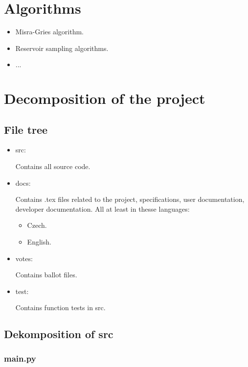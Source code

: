 \documentclass[a4paper,12pt]{report}
\begin{document}
	\section{Algorithms}
	
	\begin{itemize}
		\item Misra-Gries algorithm.
		\item Reservoir sampling algorithms.
		\item ...
	\end{itemize}
	
	\section{Decomposition of the project}
	
	\subsection{File tree}
	
	\begin{itemize}
		\item src:
		
		Contains all source code.
		
		\item docs:
		
		Contains .tex files related to the project, specifications, user documentation, developer documentation. All at least in thesse languages:
		
		\begin{itemize}
			\item Czech.
			\item English.
		\end{itemize}
		
		\item votes:
		
		Contains ballot files.
		
		\item test:
		
		Contains function tests in src.
	\end{itemize}
	
	\subsection{Dekomposition of src}
	
	\subsubsection{main.py}
	
\end{document}
